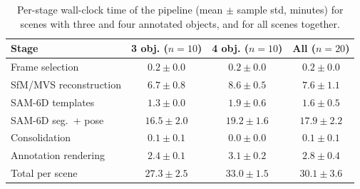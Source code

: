 \begin{table}[t]
\centering
\caption{Per-stage wall-clock time of the pipeline (mean $\pm$ sample std, minutes) for scenes with three and four annotated objects, and for all scenes together.}
\label{tab:runtime}
\begin{tabular}{lccc}
\hline
Stage & 3 obj. ($n=10$) & 4 obj. ($n=10$) & All ($n=20$) \\
\hline
Frame selection & $0.2 \pm 0.0$ & $0.2 \pm 0.0$ & $0.2 \pm 0.0$ \\
SfM/MVS reconstruction & $6.7 \pm 0.8$ & $8.6 \pm 0.5$ & $7.6 \pm 1.1$ \\
SAM-6D templates & $1.3 \pm 0.0$ & $1.9 \pm 0.6$ & $1.6 \pm 0.5$ \\
SAM-6D seg.\ + pose & $16.5 \pm 2.0$ & $19.2 \pm 1.6$ & $17.9 \pm 2.2$ \\
Consolidation & $0.1 \pm 0.1$ & $0.0 \pm 0.0$ & $0.1 \pm 0.1$ \\
Annotation rendering & $2.4 \pm 0.1$ & $3.1 \pm 0.2$ & $2.8 \pm 0.4$ \\
\hline
Total per scene & $27.3 \pm 2.5$ & $33.0 \pm 1.5$ & $30.1 \pm 3.6$ \\
\hline
\end{tabular}
\end{table}
